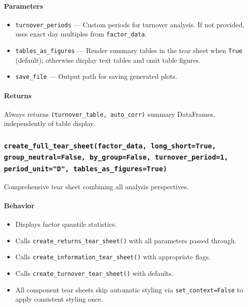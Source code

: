\documentclass[11pt]{article}
\begin{document}
\paragraph{Parameters}
\begin{itemize}
  \item \texttt{turnover\_periods} --- Custom periods for turnover analysis. If not provided, uses exact day multiples from \texttt{factor\_data}.
  \item \texttt{tables\_as\_figures} --- Render summary tables in the tear sheet when \texttt{True} (default); otherwise display text tables and omit table figures.
  \item \texttt{save\_file} --- Output path for saving generated plots.
\end{itemize}

\paragraph{Returns}
Always returns \texttt{(turnover\_table, auto\_corr)} summary DataFrames, independently of table display.

\subsubsection{\texttt{create\_full\_tear\_sheet(factor\_data, long\_short=True, group\_neutral=False, by\_group=False, turnover\_period=1, period\_unit="D", tables\_as\_figures=True)}}
Comprehensive tear sheet combining all analysis perspectives.

\paragraph{Behavior}
\begin{itemize}
  \item Displays factor quantile statistics.
  \item Calls \texttt{create\_returns\_tear\_sheet()} with all parameters passed through.
  \item Calls \texttt{create\_information\_tear\_sheet()} with appropriate flags.
  \item Calls \texttt{create\_turnover\_tear\_sheet()} with defaults.
  \item All component tear sheets skip automatic styling via \texttt{set\_context=False} to apply consistent styling once.
\end{itemize}
\end{document}
